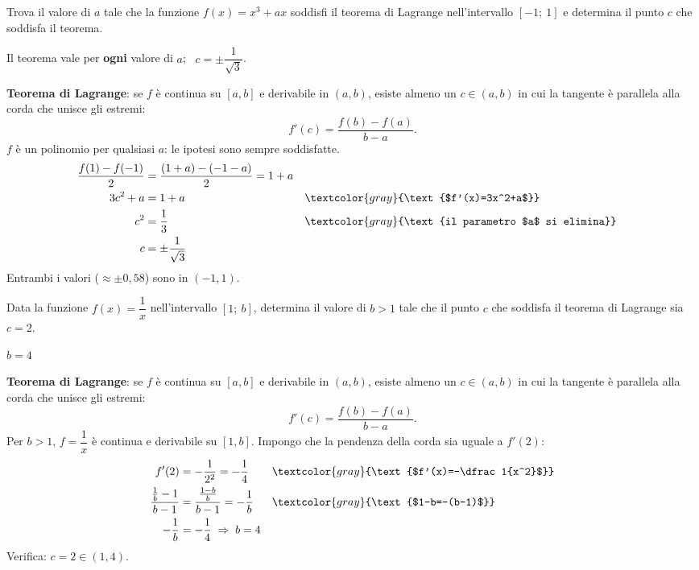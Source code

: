 
\begin{question}[ID=2.1, subtitle={Parametro $a$ per Lagrange: $x^3+ax$ su $[-1,1]$}, tags={lagrange, teoremi, parametrico}, difficulty=difficile]
Trova il valore di \(a\) tale che la funzione \(f(x) = x^3 + ax\) soddisfi il teorema di Lagrange nell'intervallo \([-1;\ 1]\) e determina il punto \(c\) che soddisfa il teorema.
\begin{solution}
Il teorema vale per \textbf{ogni} valore di $a$; \ $c=\pm\dfrac{1}{\sqrt3}$.
\end{solution}
\begin{explanation}
\textbf{Teorema di Lagrange}: se $f$ è continua su $[a,b]$ e derivabile in $(a,b)$, esiste almeno un $c\in(a,b)$ in cui la tangente è parallela alla corda che unisce gli estremi:
\[ f'(c)=\dfrac{f(b)-f(a)}{b-a}. \]
$f$ è un polinomio per qualsiasi $a$: le ipotesi sono sempre soddisfatte.
\[\begin{aligned}
\dfrac{f(1)-f(-1)}{2} &= \dfrac{(1+a)-(-1-a)}{2}=1+a\\
3c^2+a &= 1+a && \textcolor{gray}{\text{$f'(x)=3x^2+a$}}\\
c^2 &= \dfrac13 && \textcolor{gray}{\text{il parametro $a$ si elimina}}\\
c &= \pm\dfrac{1}{\sqrt3}
\end{aligned}\]
Entrambi i valori ($\approx\pm0{,}58$) sono in $(-1,1)$.
\end{explanation}
\end{question}


\begin{question}[ID=2.2, subtitle={Parametro $b$ per Lagrange: $1/x$ su $[1,b]$ con $c=2$}, tags={lagrange, teoremi, parametrico}, difficulty=media]
Data la funzione \(f(x) = \dfrac{1}{x}\) nell'intervallo \([1;\ b]\), determina il valore di \(b > 1\) tale che il punto \(c\) che soddisfa il teorema di Lagrange sia \(c = 2\).
\begin{solution}
$b=4$
\end{solution}
\begin{explanation}
\textbf{Teorema di Lagrange}: se $f$ è continua su $[a,b]$ e derivabile in $(a,b)$, esiste almeno un $c\in(a,b)$ in cui la tangente è parallela alla corda che unisce gli estremi:
\[ f'(c)=\dfrac{f(b)-f(a)}{b-a}. \]
Per $b>1$, $f=\dfrac1x$ è continua e derivabile su $[1,b]$. Impongo che la pendenza della corda sia uguale a $f'(2)$:
\[\begin{aligned}
f'(2) &= -\dfrac1{2^2}=-\dfrac14 && \textcolor{gray}{\text{$f'(x)=-\dfrac1{x^2}$}}\\
\dfrac{\frac1b-1}{b-1} &= \dfrac{\frac{1-b}{b}}{b-1}=-\dfrac1b && \textcolor{gray}{\text{$1-b=-(b-1)$}}\\
-\dfrac1b &= -\dfrac14 \;\Rightarrow\; b=4
\end{aligned}\]
Verifica: $c=2\in(1,4)$.
\end{explanation}
\end{question}

